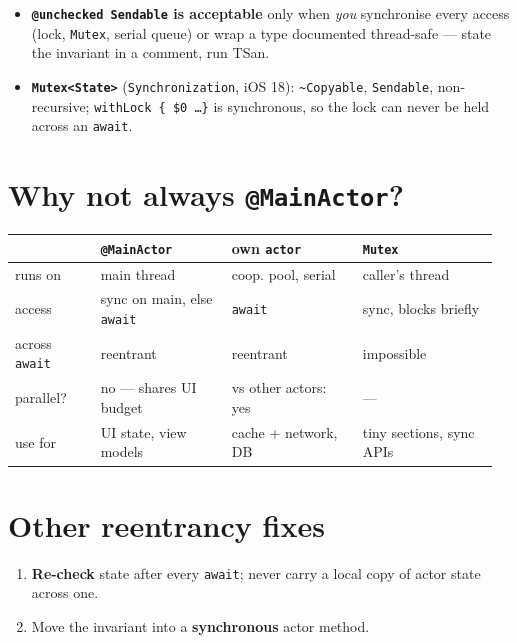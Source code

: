 \documentclass[8pt]{extarticle}
\begin{document}
\begin{multicols}{2}
\begin{itemize}
        caller's actor'' — a generic async helper that never hops, so non-Sendable
        closures are fine. Swift 6.2: \texttt{nonisolated(nonsending)} (SE-0461) gets the
        same with no parameter; \texttt{@concurrent} forces the hop off the actor.
  \item \textbf{\texttt{@unchecked Sendable} is acceptable} only when \emph{you}
        synchronise every access (lock, \texttt{Mutex}, serial queue) or wrap a
        type documented thread-safe — state the invariant in a comment, run TSan.
  \item \textbf{\texttt{Mutex<State>}} (\texttt{Synchronization},
        iOS 18): \texttt{\textasciitilde Copyable}, \texttt{Sendable}, non-recursive;
        \texttt{withLock \{ \$0 \ldots \}} is synchronous, so the lock can never be
        held across an \texttt{await}.
\end{itemize}

\section{Why not always \texttt{@MainActor}?}
{\scriptsize\setlength{\tabcolsep}{2.5pt}
\begin{tabular}{@{}L{0.17\linewidth}L{0.26\linewidth}L{0.26\linewidth}L{0.27\linewidth}@{}}
\toprule
 & \textbf{\texttt{@MainActor}} & \textbf{own \texttt{actor}} & \textbf{\texttt{Mutex}} \\ \midrule
runs on & main thread & coop. pool, serial & caller's thread \\
access & sync on main, else \texttt{await} & \texttt{await} & sync, blocks briefly \\
across \texttt{await} & reentrant & reentrant & impossible \\
parallel? & no — shares UI budget & vs other actors: yes & — \\
use for & UI state, view models & cache + network, DB & tiny sections, sync APIs \\
\bottomrule
\end{tabular}}

\section{Other reentrancy fixes}
\begin{enumerate}
  \item \textbf{Re-check} state after every \texttt{await}; never carry a local
        copy of actor state across one.
  \item Move the invariant into a \textbf{synchronous} actor method.
\end{enumerate}


\end{multicols}
\end{document}

